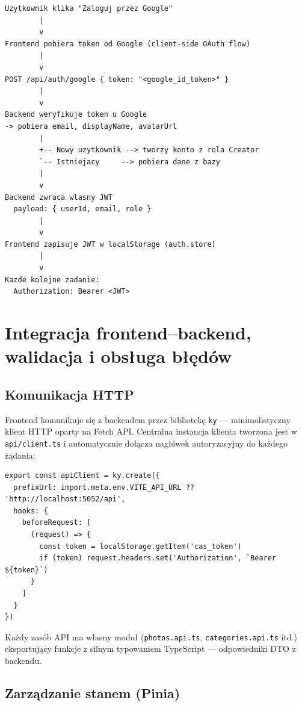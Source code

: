 \documentclass[12pt, a4paper]{article}
\begin{document}
\begin{lstlisting}[style=plain, caption={Sekwencja logowania przez OAuth}]
Uzytkownik klika "Zaloguj przez Google"
        |
        v
Frontend pobiera token od Google (client-side OAuth flow)
        |
        v
POST /api/auth/google { token: "<google_id_token>" }
        |
        v
Backend weryfikuje token u Google
-> pobiera email, displayName, avatarUrl
        |
        +-- Nowy uzytkownik --> tworzy konto z rola Creator
        `-- Istniejacy     --> pobiera dane z bazy
        |
        v
Backend zwraca wlasny JWT
  payload: { userId, email, role }
        |
        v
Frontend zapisuje JWT w localStorage (auth.store)
        |
        v
Kazde kolejne zadanie:
  Authorization: Bearer <JWT>
\end{lstlisting}

\section{Integracja frontend--backend, walidacja i obsługa błędów}

\subsection{Komunikacja HTTP}

Frontend komunikuje się z backendem przez bibliotekę \texttt{ky} --- minimalistyczny klient
HTTP oparty na Fetch API. Centralna instancja klienta tworzona jest w \texttt{api/client.ts}
i automatycznie dołącza nagłówek autoryzacyjny do każdego żądania:

\begin{lstlisting}[style=typescript, caption={Konfiguracja centralnego klienta HTTP (api/client.ts)}]
export const apiClient = ky.create({
  prefixUrl: import.meta.env.VITE_API_URL ?? 'http://localhost:5052/api',
  hooks: {
    beforeRequest: [
      (request) => {
        const token = localStorage.getItem('cas_token')
        if (token) request.headers.set('Authorization', `Bearer ${token}`)
      }
    ]
  }
})
\end{lstlisting}

Każdy zasób API ma własny moduł (\texttt{photos.api.ts}, \texttt{categories.api.ts} itd.)
eksportujący funkcje z silnym typowaniem TypeScript --- odpowiedniki DTO z backendu.

\subsection{Zarządzanie stanem (Pinia)}
\end{document}
